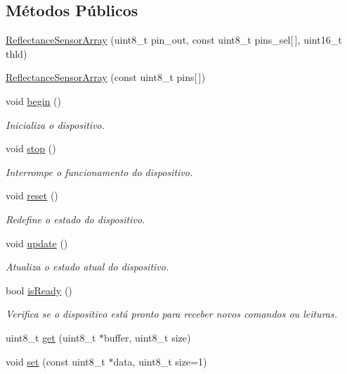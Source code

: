 \subsection*{Métodos Públicos}
\begin{DoxyCompactItemize}
\item 
\hyperlink{classReflectanceSensorArray_a4e1aebfbf34f73ac86628213dfa106e7}{Reflectance\-Sensor\-Array} (uint8\-\_\-t pin\-\_\-out, const uint8\-\_\-t pins\-\_\-sel\mbox{[}$\,$\mbox{]}, uint16\-\_\-t thld)
\item 
\hyperlink{classReflectanceSensorArray_a8597647e8737a1a868dc8240e12774f1}{Reflectance\-Sensor\-Array} (const uint8\-\_\-t pins\mbox{[}$\,$\mbox{]})
\item 
void \hyperlink{classReflectanceSensorArray_a11602e4c9b93577608b07088f9c0fd3c}{begin} ()
\begin{DoxyCompactList}\small\item\em Inicializa o dispositivo. \end{DoxyCompactList}\item 
void \hyperlink{classReflectanceSensorArray_ae83ddbd02df0b879bf67c99a02341f2b}{stop} ()
\begin{DoxyCompactList}\small\item\em Interrompe o funcionamento do dispositivo. \end{DoxyCompactList}\item 
void \hyperlink{classReflectanceSensorArray_aed9eaebad7add3ac016ea8af942261a5}{reset} ()
\begin{DoxyCompactList}\small\item\em Redefine o estado do dispositivo. \end{DoxyCompactList}\item 
void \hyperlink{classReflectanceSensorArray_a3a5f7c29c3a72026365df9cf9791e3e5}{update} ()
\begin{DoxyCompactList}\small\item\em Atualiza o estado atual do dispositivo. \end{DoxyCompactList}\item 
bool \hyperlink{classReflectanceSensorArray_a7781688e68d77cce4f7c70bbe242113b}{is\-Ready} ()
\begin{DoxyCompactList}\small\item\em Verifica se o dispositivo está pronto para receber novos comandos ou leituras. \end{DoxyCompactList}\item 
uint8\-\_\-t \hyperlink{classReflectanceSensorArray_ad608c5f45ea98fe65162d8c24722bc15}{get} (uint8\-\_\-t $\ast$buffer, uint8\-\_\-t size)
\item 
void \hyperlink{classReflectanceSensorArray_a023408b8b40cea4a74c5c1837a39d701}{set} (const uint8\-\_\-t $\ast$data, uint8\-\_\-t size=1)
\end{DoxyCompactItemize}


